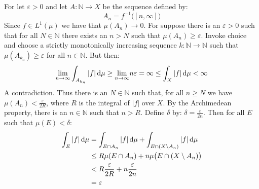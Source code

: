 \documentclass[crop=false,class=article]{standalone}                           %
\begin{document}
        \begin{solution}
            For let $\varepsilon>0$ and let $A:\mathbb{N}\rightarrow{X}$ be the
            sequence defined by:
            \begin{equation}
                A_{n}=f^{\minus{1}}\big([n,\infty]\big)
            \end{equation}
            Since $f\in{L}^{1}(\mu)$ we have that $\mu(A_{n})\rightarrow{0}$.
            For suppose there is an $\varepsilon>0$ such that for all
            $N\in\mathbb{N}$ there exists an $n>N$ such that
            $\mu(A_{n})\geq\varepsilon$. Invoke choice and choose a strictly
            monotonically increasing sequence
            $k:\mathbb{N}\rightarrow\mathbb{N}$ such that
            $\mu(A_{k_{n}})\geq\varepsilon$ for all $n\in\mathbb{N}$. But then:
            \begin{equation}
                \underset{n\rightarrow\infty}{\lim}\int_{A_{k_{n}}}|f|\mathop{}\!\mathrm{d}{\mu}
                \geq\underset{n\rightarrow\infty}{\lim}n\varepsilon
                =\infty\leq\int_{X}|f|\mathop{}\!\mathrm{d}{\mu}<\infty
            \end{equation}
            A contradiction. Thus there is an $N\in\mathbb{N}$ such that, for
            all $n\geq{N}$ we have $\mu(A_{n})<\frac{\varepsilon}{2R}$, where
            $R$ is the integral of $|f|$ over $X$. By the Archimedean property,
            there is an $n\in\mathbb{N}$ such that $n>R$. Define $\delta$ by:
            $\delta=\frac{\varepsilon}{2n}$. Then for all $E$ such that
            $\mu(E)<\delta$:
            \begin{subequations}
                \begin{align}
                    \int_{E}|f|\mathop{}\!\mathrm{d}{\mu}
                    &=\int_{E\cap{A}_{n}}|f|\mathop{}\!\mathrm{d}{\mu}
                        +\int_{E\cap(X\setminus{A}_{n})}|f|\mathop{}\!\mathrm{d}{\mu}\\
                    &\leq{R}\mu(E\cap{A}_{n})
                    +n\mu\big(E\cap(X\setminus{A}_{n})\big)\\
                    &<R\frac{\varepsilon}{2R}+n\frac{\varepsilon}{2n}\\
                    &=\varepsilon
                \end{align}
            \end{subequations}
        \end{solution}
\end{document}
